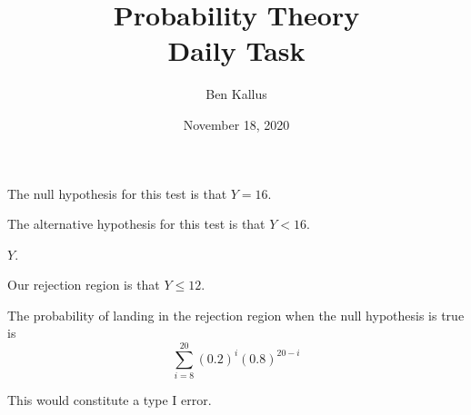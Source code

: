 \documentclass[12pt]{article}
\title{Probability Theory \\ Daily Task}
\author{Ben Kallus}
\date{November 18, 2020}
\begin{document}
\color{white}
\pagecolor{black}
\maketitle

 The null hypothesis for this test is that $Y=16$.

 The alternative hypothesis for this test is that $Y < 16$.

 $Y$.

 Our rejection region is that $Y \leq 12$.

The probability of landing in the rejection region when the null hypothesis is true is
$$\sum_{i=8}^{20}(0.2)^i(0.8)^{20-i}$$

This would constitute a type I error.
\end{document}
